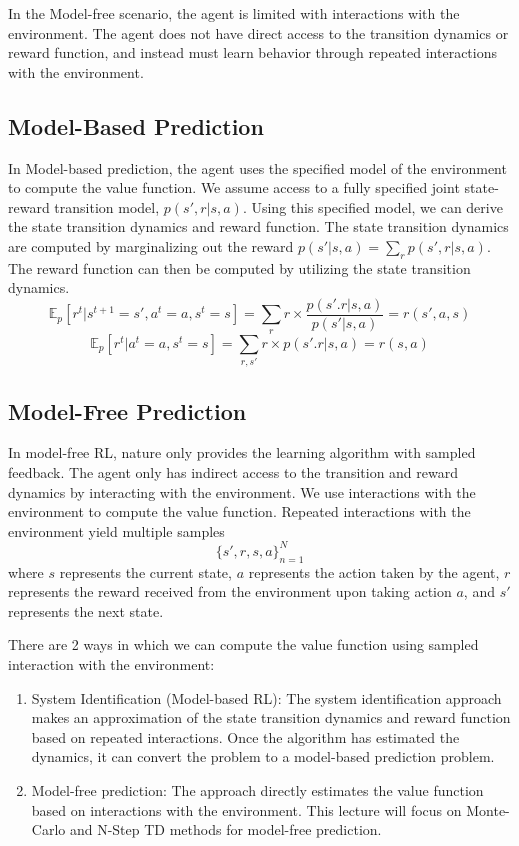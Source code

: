 \documentclass[11pt]{article}
\def\EE{\mathbb{E}}
\begin{document}
In the Model-free scenario, the agent is limited with interactions with the environment. The agent does not have direct access to the transition dynamics or reward function, and instead must learn behavior through repeated interactions with the environment. 



\subsection{Model-Based Prediction}

In Model-based prediction, the agent uses the specified model of the environment to compute the value function. We assume access to a fully specified joint state-reward transition model, $p(s', r|s,a)$. Using this specified model, we can derive the state transition dynamics and reward function. The state transition dynamics are computed by marginalizing out the reward $p(s'|s,a) = \sum_r p(s', r|s, a)$. The reward function can then be computed by utilizing the state transition dynamics.
$$\EE_p[r^t|s^{t+1}=s', a^t=a, s^t = s] = \sum_r r\times \frac{p(s'. r|s, a)}{p(s'|s,a)} = r(s', a, s)$$
$$\EE_p[r^t|a^t=a, s^t = s] = \sum_{r, s'} r\times p(s'. r|s, a) = r(s, a)$$


\subsection{Model-Free Prediction}
In model-free RL, nature only provides the learning algorithm with sampled feedback. The agent only has indirect access to the transition and reward dynamics by interacting with the environment. We use interactions with the environment to compute the value function. Repeated interactions with the environment yield multiple samples $$\{s', r, s, a\}_{n=1}^N$$ where $s$ represents the current state, $a$ represents the action taken by the agent, $r$ represents the reward received from the environment upon taking action $a$, and $s'$ represents the next state.

There are 2 ways in which we can compute the value function using sampled interaction with the environment:
\begin{enumerate}
    \item System Identification (Model-based RL): The system identification approach makes an approximation of the state transition dynamics and reward function based on repeated interactions. Once the algorithm has estimated the dynamics, it can convert the problem to a model-based prediction problem. 
    \item Model-free prediction: The approach directly estimates the value function based on interactions with the environment. This lecture will focus on Monte-Carlo and N-Step TD methods for model-free prediction.
\end{enumerate}
\end{document}
